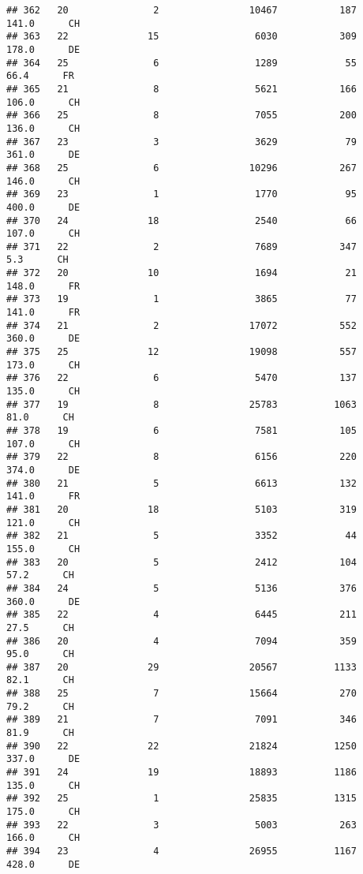 \documentclass[
]{article}
\begin{document}
\begin{verbatim}
## 362   20               2                10467           187    141.0      CH
## 363   22              15                 6030           309    178.0      DE
## 364   25               6                 1289            55     66.4      FR
## 365   21               8                 5621           166    106.0      CH
## 366   25               8                 7055           200    136.0      CH
## 367   23               3                 3629            79    361.0      DE
## 368   25               6                10296           267    146.0      CH
## 369   23               1                 1770            95    400.0      DE
## 370   24              18                 2540            66    107.0      CH
## 371   22               2                 7689           347      5.3      CH
## 372   20              10                 1694            21    148.0      FR
## 373   19               1                 3865            77    141.0      FR
## 374   21               2                17072           552    360.0      DE
## 375   25              12                19098           557    173.0      CH
## 376   22               6                 5470           137    135.0      CH
## 377   19               8                25783          1063     81.0      CH
## 378   19               6                 7581           105    107.0      CH
## 379   22               8                 6156           220    374.0      DE
## 380   21               5                 6613           132    141.0      FR
## 381   20              18                 5103           319    121.0      CH
## 382   21               5                 3352            44    155.0      CH
## 383   20               5                 2412           104     57.2      CH
## 384   24               5                 5136           376    360.0      DE
## 385   22               4                 6445           211     27.5      CH
## 386   20               4                 7094           359     95.0      CH
## 387   20              29                20567          1133     82.1      CH
## 388   25               7                15664           270     79.2      CH
## 389   21               7                 7091           346     81.9      CH
## 390   22              22                21824          1250    337.0      DE
## 391   24              19                18893          1186    135.0      CH
## 392   25               1                25835          1315    175.0      CH
## 393   22               3                 5003           263    166.0      CH
## 394   23               4                26955          1167    428.0      DE

\end{verbatim}
\end{document}
